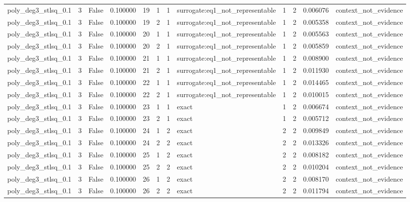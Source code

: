 \begin{tabular}{lrrrrrrlrrrl}
poly\_deg3\_stlsq\_0.1 & 3 & False & 0.100000 & 19 & 1 & 1 & surrogate:eq1\_not\_representable & 1 & 2 & 0.006076 & context\_not\_evidence \\
poly\_deg3\_stlsq\_0.1 & 3 & False & 0.100000 & 19 & 2 & 1 & surrogate:eq1\_not\_representable & 1 & 2 & 0.005358 & context\_not\_evidence \\
poly\_deg3\_stlsq\_0.1 & 3 & False & 0.100000 & 20 & 1 & 1 & surrogate:eq1\_not\_representable & 1 & 2 & 0.005563 & context\_not\_evidence \\
poly\_deg3\_stlsq\_0.1 & 3 & False & 0.100000 & 20 & 2 & 1 & surrogate:eq1\_not\_representable & 1 & 2 & 0.005859 & context\_not\_evidence \\
poly\_deg3\_stlsq\_0.1 & 3 & False & 0.100000 & 21 & 1 & 1 & surrogate:eq1\_not\_representable & 1 & 2 & 0.008900 & context\_not\_evidence \\
poly\_deg3\_stlsq\_0.1 & 3 & False & 0.100000 & 21 & 2 & 1 & surrogate:eq1\_not\_representable & 1 & 2 & 0.011930 & context\_not\_evidence \\
poly\_deg3\_stlsq\_0.1 & 3 & False & 0.100000 & 22 & 1 & 1 & surrogate:eq1\_not\_representable & 1 & 2 & 0.014465 & context\_not\_evidence \\
poly\_deg3\_stlsq\_0.1 & 3 & False & 0.100000 & 22 & 2 & 1 & surrogate:eq1\_not\_representable & 1 & 2 & 0.010015 & context\_not\_evidence \\
poly\_deg3\_stlsq\_0.1 & 3 & False & 0.100000 & 23 & 1 & 1 & exact & 1 & 2 & 0.006674 & context\_not\_evidence \\
poly\_deg3\_stlsq\_0.1 & 3 & False & 0.100000 & 23 & 2 & 1 & exact & 1 & 2 & 0.005712 & context\_not\_evidence \\
poly\_deg3\_stlsq\_0.1 & 3 & False & 0.100000 & 24 & 1 & 2 & exact & 2 & 2 & 0.009849 & context\_not\_evidence \\
poly\_deg3\_stlsq\_0.1 & 3 & False & 0.100000 & 24 & 2 & 2 & exact & 2 & 2 & 0.013326 & context\_not\_evidence \\
poly\_deg3\_stlsq\_0.1 & 3 & False & 0.100000 & 25 & 1 & 2 & exact & 2 & 2 & 0.008182 & context\_not\_evidence \\
poly\_deg3\_stlsq\_0.1 & 3 & False & 0.100000 & 25 & 2 & 2 & exact & 2 & 2 & 0.010204 & context\_not\_evidence \\
poly\_deg3\_stlsq\_0.1 & 3 & False & 0.100000 & 26 & 1 & 2 & exact & 2 & 2 & 0.008170 & context\_not\_evidence \\
poly\_deg3\_stlsq\_0.1 & 3 & False & 0.100000 & 26 & 2 & 2 & exact & 2 & 2 & 0.011794 & context\_not\_evidence \\

\end{tabular}

